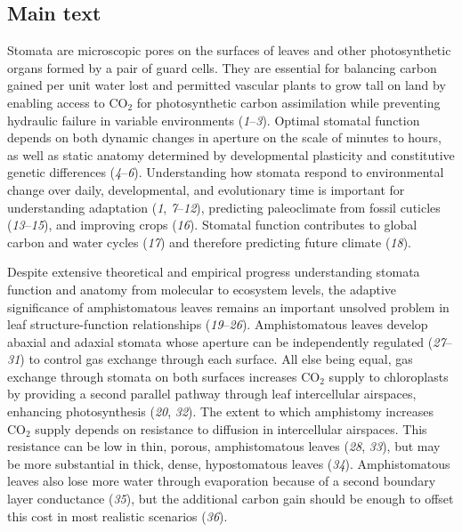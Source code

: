 \documentclass[
  letterpaper,
  DIV=11,
  numbers=noendperiod]{scrartcl}
\begin{document}
\subsection{Main text}\label{main-text}

Stomata are microscopic pores on the surfaces of leaves and other
photosynthetic organs formed by a pair of guard cells. They are
essential for balancing carbon gained per unit water lost and permitted
vascular plants to grow tall on land by enabling access to CO\(_2\) for
photosynthetic carbon assimilation while preventing hydraulic failure in
variable environments (\emph{1}--\emph{3}). Optimal stomatal function
depends on both dynamic changes in aperture on the scale of minutes to
hours, as well as static anatomy determined by developmental plasticity
and constitutive genetic differences (\emph{4}--\emph{6}). Understanding
how stomata respond to environmental change over daily, developmental,
and evolutionary time is important for understanding adaptation
(\emph{1}, \emph{7}--\emph{12}), predicting paleoclimate from fossil
cuticles (\emph{13}--\emph{15}), and improving crops (\emph{16}).
Stomatal function contributes to global carbon and water cycles
(\emph{17}) and therefore predicting future climate (\emph{18}).

Despite extensive theoretical and empirical progress understanding
stomata function and anatomy from molecular to ecosystem levels, the
adaptive significance of amphistomatous leaves remains an important
unsolved problem in leaf structure-function relationships
(\emph{19}--\emph{26}). Amphistomatous leaves develop abaxial and
adaxial stomata whose aperture can be independently regulated
(\emph{27}--\emph{31}) to control gas exchange through each surface. All
else being equal, gas exchange through stomata on both surfaces
increases CO\(_2\) supply to chloroplasts by providing a second parallel
pathway through leaf intercellular airspaces, enhancing photosynthesis
(\emph{20}, \emph{32}). The extent to which amphistomy increases
CO\(_2\) supply depends on resistance to diffusion in intercellular
airspaces. This resistance can be low in thin, porous, amphistomatous
leaves (\emph{28}, \emph{33}), but may be more substantial in thick,
dense, hypostomatous leaves (\emph{34}). Amphistomatous leaves also lose
more water through evaporation because of a second boundary layer
conductance (\emph{35}), but the additional carbon gain should be enough
to offset this cost in most realistic scenarios (\emph{36}).
\end{document}
